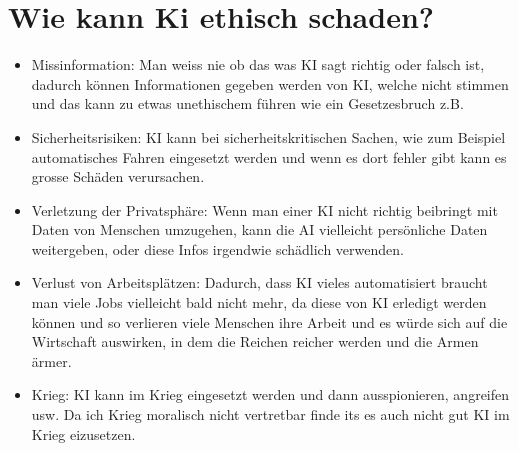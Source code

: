 \documentclass{report}
\begin{document}
\section{Wie kann Ki ethisch schaden?}
\begin{itemize}
    \item Missinformation: Man weiss nie ob das was KI sagt richtig oder falsch ist, dadurch können Informationen gegeben werden von KI, welche nicht stimmen und das kann zu etwas unethischem führen wie ein Gesetzesbruch z.B.
    \item Sicherheitsrisiken: KI kann bei sicherheitskritischen Sachen, wie zum Beispiel automatisches Fahren eingesetzt werden und wenn es dort fehler gibt kann es grosse Schäden verursachen.
    \item Verletzung der Privatsphäre: Wenn man einer KI nicht richtig beibringt mit Daten von Menschen umzugehen, kann die AI vielleicht persönliche Daten weitergeben, oder diese Infos irgendwie schädlich verwenden.
    \item Verlust von Arbeitsplätzen: Dadurch, dass KI vieles automatisiert braucht man viele Jobs vielleicht bald nicht mehr, da diese von KI erledigt werden können und so verlieren viele Menschen ihre Arbeit und es würde sich auf die Wirtschaft auswirken, in dem die Reichen reicher werden und die Armen ärmer.
    \item Krieg: KI kann im Krieg eingesetzt werden und dann ausspionieren, angreifen usw. Da ich Krieg moralisch nicht vertretbar finde its es auch nicht gut KI im Krieg eizusetzen.
\end{itemize}
\printbibliography
\end{document}
